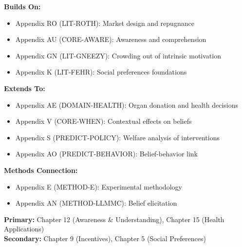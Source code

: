 \begin{tcolorbox}[colback=blue!5!white,colframe=blue!75!black,title=Cross-Reference Map]
\textbf{Builds On:}
\begin{itemize}
    \item Appendix RO (LIT-ROTH): Market design and repugnance
    \item Appendix AU (CORE-AWARE): Awareness and comprehension
    \item Appendix GN (LIT-GNEEZY): Crowding out of intrinsic motivation
    \item Appendix K (LIT-FEHR): Social preferences foundations
\end{itemize}

\textbf{Extends To:}
\begin{itemize}
    \item Appendix AE (DOMAIN-HEALTH): Organ donation and health decisions
    \item Appendix V (CORE-WHEN): Contextual effects on beliefs
    \item Appendix S (PREDICT-POLICY): Welfare analysis of interventions
    \item Appendix AO (PREDICT-BEHAVIOR): Belief-behavior link
\end{itemize}

\textbf{Methods Connection:}
\begin{itemize}
    \item Appendix E (METHOD-E): Experimental methodology
    \item Appendix AN (METHOD-LLMMC): Belief elicitation
\end{itemize}
\end{tcolorbox}

\begin{tcolorbox}[colback=green!5!white,colframe=green!75!black,title=Chapter Linkage]
\textbf{Primary:} Chapter 12 (Awareness \& Understanding), Chapter 15 (Health Applications) \\
\textbf{Secondary:} Chapter 9 (Incentives), Chapter 5 (Social Preferences)
\end{tcolorbox}

